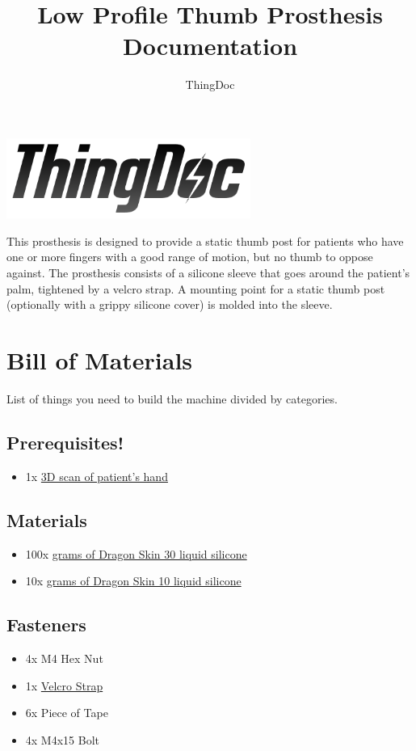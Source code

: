 \documentclass[11pt]{article}
\title{Low Profile Thumb Prosthesis Documentation}
\author{ThingDoc}
\begin{document}
\maketitle
\begin{center}
\includegraphics[width=8cm]{logo.png}
\end{center}
This prosthesis is designed to provide a static thumb post for patients who have one or more fingers with a good range of motion, but no thumb to oppose against. The prosthesis consists of a silicone sleeve that goes around the patient's palm, tightened by a velcro strap. A mounting point for a static thumb post (optionally with a grippy silicone cover) is molded into the sleeve.

\newpage

\tableofcontents

\newpage

\section{Bill of Materials}
List of things you need to build the machine divided by categories.

\subsection{Prerequisites!}
\begin{itemize}
\item 1x \hyperlink{thing_hand\_scan}{3D scan of patient's hand}
\end{itemize}

\subsection{Materials}
\begin{itemize}
\item 100x \hyperlink{thing_g\_dragon\_skin\_30}{grams of Dragon Skin 30 liquid silicone}
\item 10x \hyperlink{thing_g\_dragon\_skin\_10}{grams of Dragon Skin 10 liquid silicone}
\end{itemize}

\subsection{Fasteners}
\begin{itemize}
\item 4x M4 Hex Nut
\item 1x \hyperlink{thing_velcro\_strap}{Velcro Strap}
\item 6x Piece of Tape
\item 4x M4x15 Bolt
\end{itemize}
\end{document}

